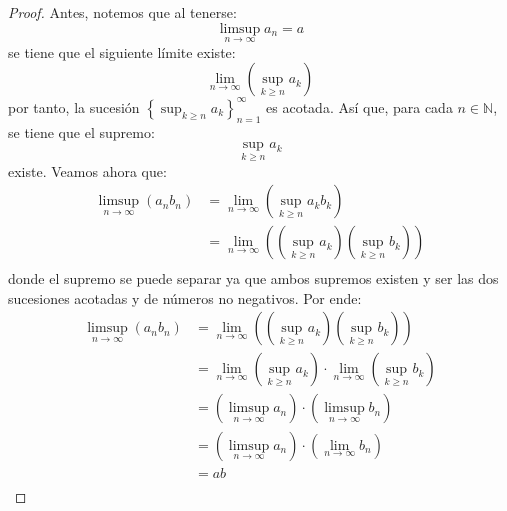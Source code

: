 \documentclass[12pt]{report}
\newcounter{it}
\theoremstyle{largebreak}
\begin{document}
    \begin{proof}
        Antes, notemos que al tenerse:
        \begin{equation*}
            \limsup_{ n\rightarrow\infty}a_n=a
        \end{equation*}
        se tiene que el siguiente límite existe:
        \begin{equation*}
            \lim_{ n\rightarrow\infty}\left(\sup_{ k\geq n}a_k \right)
        \end{equation*}
        por tanto, la sucesión $\left\{\sup_{ k\geq n}a_k\right\}_{ n=1}^\infty$ es acotada. Así que, para cada $n\in\mathbb{N}$, se tiene que el supremo:
        \begin{equation*}
            \sup_{ k\geq n}a_k
        \end{equation*}
        existe. Veamos ahora que:
        \begin{equation*}
            \begin{split}
                \limsup_{ n\rightarrow\infty}(a_nb_n)&=\lim_{ n\rightarrow\infty}\left(\sup_{ k\geq n}a_kb_k \right)\\
                &=\lim_{ n\rightarrow\infty}\left(\left(\sup_{ k\geq n}a_k\right)\left(\sup_{ k\geq n}b_k\right) \right)\\
            \end{split}
        \end{equation*}
        donde el supremo se puede separar ya que ambos supremos existen y ser las dos sucesiones acotadas y de números no negativos. Por ende:
        \begin{equation*}
            \begin{split}
                \limsup_{ n\rightarrow\infty}(a_nb_n)&=\lim_{ n\rightarrow\infty}\left(\left(\sup_{ k\geq n}a_k\right)\left(\sup_{ k\geq n}b_k\right) \right)\\
                &=\lim_{ n\rightarrow\infty}\left(\sup_{ k\geq n} a_k\right)\cdot\lim_{ n\rightarrow\infty}\left(\sup_{ k\geq n}b_k\right)\\
                &=\left(\limsup_{ n\rightarrow\infty}a_n\right)\cdot\left(\limsup_{ n\rightarrow\infty}b_n\right)\\
                &=\left(\limsup_{ n\rightarrow\infty}a_n\right)\cdot\left(\lim_{ n\rightarrow\infty}b_n\right)\\
                &=ab\\
            \end{split}
        \end{equation*}
    \end{proof}
\end{document}
